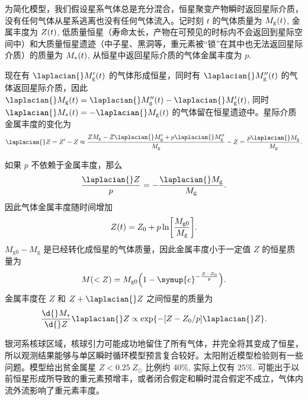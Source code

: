 \documentclass[../天体物理基础.tex]{subfiles}
\begin{document}
为简化模型，我们假设星系气体总是充分混合，恒星聚变产物瞬时返回星际介质，没有任何气体从星系逃离也没有任何气体流入。记时刻 $t$ 的气体质量为 $M_{\mathrm{g}}\mleft(t\mright)$, 金属丰度为 $Z\mleft(t\mright)$, 低质量恒星（寿命太长，产物在可预见的时标内不会返回到星际空间中）和大质量恒星遗迹（中子星、黑洞等，重元素被“锁”在其中也无法返回星际介质）的质量为 $M_{*}\mleft(t\mright)$, 从恒星中返回星际介质的气体金属丰度为 $p$.

现在有 $\laplacian{}M_{\mathrm{g}}'\mleft(t\mright)$ 的气体形成恒星，同时有 $\laplacian{}M_{\mathrm{g}}''\mleft(t\mright)$ 的气体返回星际介质，因此 $\laplacian{}M_{\mathrm{g}}\mleft(t\mright)=\laplacian{}M_{\mathrm{g}}''\mleft(t\mright)-\laplacian{}M_{\mathrm{g}}'\mleft(t\mright)$, 同时 $\laplacian{}M_{*}\mleft(t\mright)=-\laplacian{}M_{\mathrm{g}}\mleft(t\mright)$ 的气体留在恒星遗迹中。星际介质金属丰度的变化为
\begin{equation}
\laplacian{}Z=Z'-Z\approx\frac{ZM_{\mathrm{g}}-Z\laplacian{}M_{\mathrm{g}}'+p\laplacian{}M_{\mathrm{g}}''}{M_{\mathrm{g}}}-Z=\frac{p\laplacian{}M_{\mathrm{g}}}{M_{\mathrm{g}}}.
\end{equation}

如果 $p$ 不依赖于金属丰度，那么
\begin{equation}
\frac{\laplacian{}Z}{p}=-\frac{\laplacian{}M_{\mathrm{g}}}{M_{\mathrm{g}}}.
\end{equation}
因此气体金属丰度随时间增加
\begin{equation}
Z\mleft(t\mright)=Z_{0}+p\ln\mleft[\frac{M_{\mathrm{g}0}}{M_{\mathrm{g}}}\mright].
\end{equation}
$M_{\mathrm{g}0}-M_{\mathrm{g}}$ 是已经转化成恒星的气体质量，因此金属丰度小于一定值 $Z$ 的恒星质量为
\begin{equation}
M\mleft(<Z\mright)=M_{\mathrm{g}0}\mleft(1-\symup{e}^{-\frac{Z-Z_{0}}{p}}\mright).
\end{equation}
金属丰度在 $Z$ 和 $Z+\laplacian{}Z$ 之间恒星的质量为
\begin{equation}
\frac{\d{}M_{*}}{\d{}Z}\laplacian{}Z\propto\exp\mleft\{-\mleft[Z-Z_{0}/p\mright]\laplacian{}Z\mright\}.
\end{equation}

银河系核球区域，核球引力可能成功地留住了所有气体，并完全将其变成了恒星，所以观测结果能够与单区瞬时循环模型预言复合较好。太阳附近模型检验则有一些问题。模型给出贫金属星 $Z<\qty{0.25}{Z_{\odot}}$ 比例约 40\%, 实际上仅有 $25\%$. 可能出于以前恒星形成所导致的重元素预增丰，或者闭合假定和瞬时混合假定不成立，气体内流外流影响了重元素丰度。
\end{document}
